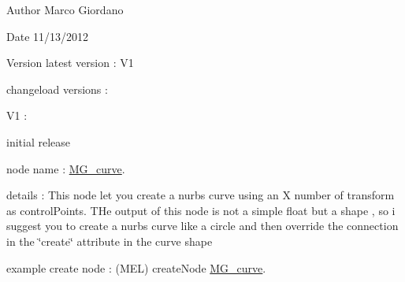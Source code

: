 \begin{DoxyAuthor}{Author}
Marco Giordano 
\end{DoxyAuthor}
\begin{DoxyDate}{Date}
11/13/2012 
\end{DoxyDate}
\begin{DoxyVersion}{Version}
latest version \-: V1 

changeload versions \-: \par
 V1 \-: \par

\begin{DoxyItemize}
\item initial release \par

\end{DoxyItemize}
\end{DoxyVersion}
node name \-: \hyperlink{class_m_g__curve}{M\-G\-\_\-curve}.

details \-: This node let you create a nurbs curve using an X number of transform as control\-Points. T\-He output of this node is not a simple float but a shape , so i suggest you to create a nurbs curve like a circle and then override the connection in the \char`\"{}create\char`\"{} attribute in the curve shape

example create node \-: (M\-E\-L) create\-Node \hyperlink{class_m_g__curve}{M\-G\-\_\-curve}. 

